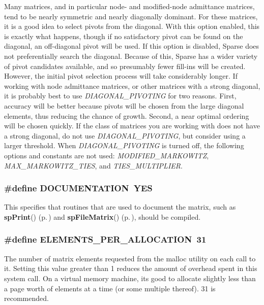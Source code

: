 Many matrices, and in particular node- and modified-node admittance matrices, tend to be nearly symmetric and nearly diagonally dominant. For these matrices, it is a good idea to select pivots from the diagonal. With this option enabled, this is exactly what happens, though if no satisfactory pivot can be found on the diagonal, an off-diagonal pivot will be used. If this option is disabled, Sparse does not preferentially search the diagonal. Because of this, Sparse has a wider variety of pivot candidates available, and so presumably fewer fill-ins will be created. However, the initial pivot selection process will take considerably longer. If working with node admittance matrices, or other matrices with a strong diagonal, it is probably best to use {\em DIAGONAL\_\-PIVOTING} for two reasons. First, accuracy will be better because pivots will be chosen from the large diagonal elements, thus reducing the chance of growth. Second, a near optimal ordering will be chosen quickly. If the class of matrices you are working with does not have a strong diagonal, do not use {\em DIAGONAL\_\-PIVOTING}, but consider using a larger threshold. When {\em DIAGONAL\_\-PIVOTING} is turned off, the following options and constants are not used: {\em MODIFIED\_\-MARKOWITZ}, {\em MAX\_\-MARKOWITZ\_\-TIES}, and {\em TIES\_\-MULTIPLIER}. 
\subsubsection{\setlength{\rightskip}{0pt plus 5cm}\#define DOCUMENTATION\ YES}\label{spConfig_8h_a13}


This specifies that routines that are used to document the matrix, such as {\bf sp\-Print}() {\rm (p.\,\pageref{spOutput_8c_a3})} and {\bf sp\-File\-Matrix}() {\rm (p.\,\pageref{spOutput_8c_a4})}, should be compiled. 
\subsubsection{\setlength{\rightskip}{0pt plus 5cm}\#define ELEMENTS\_\-PER\_\-ALLOCATION\ 31}\label{spConfig_8h_a27}


The number of matrix elements requested from the malloc utility on each call to it. Setting this value greater than 1 reduces the amount of overhead spent in this system call. On a virtual memory machine, its good to allocate slightly less than a page worth of elements at a time (or some multiple thereof). 31 is recommended. 
